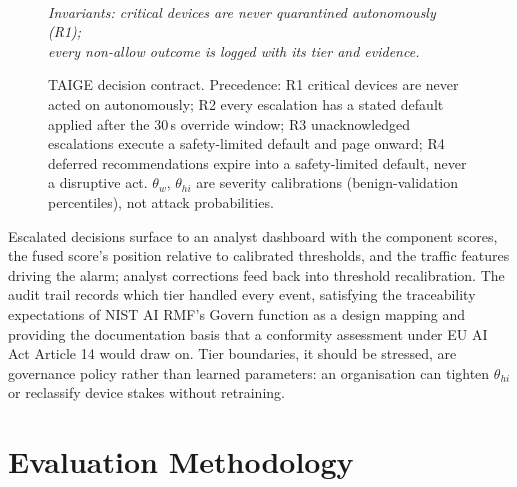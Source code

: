 \documentclass[sigconf,review,anonymous]{acmart}
\begin{document}
\begin{figure}[t]
\begin{minipage}{0.96\linewidth}
\rule{0pt}{0pt}\\
\emph{Invariants: critical devices are never quarantined autonomously (R1);}\\
\emph{every non-allow outcome is logged with its tier and evidence.}
\end{minipage}
\caption{TAIGE decision contract. Precedence: R1 critical devices are never acted on autonomously; R2 every escalation has a stated default applied after the 30\,s override window; R3 unacknowledged escalations execute a safety-limited default and page onward; R4 deferred recommendations expire into a safety-limited default, never a disruptive act. $\theta_w$, $\theta_{hi}$ are severity calibrations (benign-validation percentiles), not attack probabilities.}
\label{fig:contract}
\end{figure}

Escalated decisions surface to an analyst dashboard with the component scores, the fused score's position relative to calibrated thresholds, and the traffic features driving the alarm; analyst corrections feed back into threshold recalibration. The audit trail records which tier handled every event, satisfying the traceability expectations of NIST AI RMF's Govern function as a design mapping and providing the documentation basis that a conformity assessment under EU AI Act Article 14 would draw on. Tier boundaries, it should be stressed, are governance policy rather than learned parameters: an organisation can tighten $\theta_{hi}$ or reclassify device stakes without retraining.

\section{Evaluation Methodology}
\label{sec:method}
\end{document}
